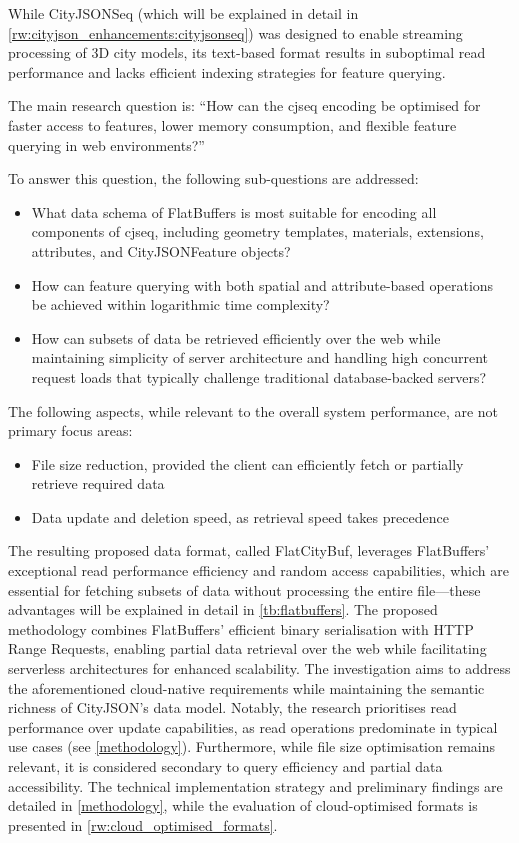 While CityJSONSeq (which will be explained in detail in \autoref{rw:cityjson_enhancements:cityjsonseq}) was designed to enable streaming processing of 3D city models, its text-based format results in suboptimal read performance and lacks efficient indexing strategies for feature querying.

The main research question is:
``How can the \ac{cjseq} encoding be optimised for faster access to features, lower memory consumption, and flexible feature querying in web environments?''

To answer this question, the following sub-questions are addressed:
\begin{itemize}
  \item What data schema of FlatBuffers is most suitable for encoding all components of \ac{cjseq}, including geometry templates, materials, extensions, attributes, and CityJSONFeature objects?
  \item How can feature querying with both spatial and attribute-based operations be achieved within logarithmic time complexity?
  \item How can subsets of data be retrieved efficiently over the web while maintaining simplicity of server architecture and handling high concurrent request loads that typically challenge traditional database-backed servers?
\end{itemize}

The following aspects, while relevant to the overall system performance, are not primary focus areas:
\begin{itemize}
  \item File size reduction, provided the client can efficiently fetch or partially retrieve required data
  \item Data update and deletion speed, as retrieval speed takes precedence
\end{itemize}

The resulting proposed data format, called FlatCityBuf, leverages FlatBuffers' exceptional read performance efficiency and random access capabilities, which are essential for fetching subsets of data without processing the entire file—these advantages will be explained in detail in \autoref{tb:flatbuffers}.
The proposed methodology combines FlatBuffers' efficient binary serialisation with HTTP Range Requests, enabling partial data retrieval over the web while facilitating serverless architectures for enhanced scalability.
The investigation aims to address the aforementioned cloud-native requirements while maintaining the semantic richness of CityJSON's data model.
Notably, the research prioritises read performance over update capabilities, as read operations predominate in typical use cases (see \autoref{methodology}).
Furthermore, while file size optimisation remains relevant, it is considered secondary to query efficiency and partial data accessibility.
The technical implementation strategy and preliminary findings are detailed in \autoref{methodology}, while the evaluation of cloud-optimised formats is presented in \autoref{rw:cloud_optimised_formats}.

